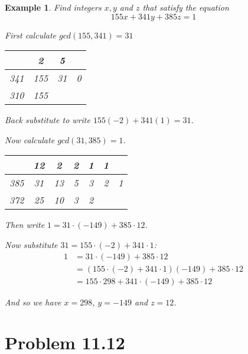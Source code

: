 \documentclass[letterpaper, 12pt, oneside]{memoir}
\theoremstyle{mystyle}
\newtheorem{example}[thm]{Example}
\begin{document}
\begin{example}
    Find integers $x, y$ and $z$ that satisfy the equation
    \[155x + 341y + 385z = 1 \]
    
    First calculate $gcd(155, 341) = 31$
    \begin{table}[H]
    \centering
    \begin{tabular}{c|c|c|c}
            & 2   & 5  &   \\ \hline
        341 & 155 & 31 & 0 \\ \hline
        310 & 155 &    & 
    \end{tabular}
    \end{table}
    
    Back substitute to write $155(-2) + 341(1)= 31$.
    
    Now calculate $gcd(31, 385) = 1$.
     \begin{table}[H]
    \centering
    \begin{tabular}{c|c|c|c|c|c|c}
            & 12  & 2   & 2  & 1  & 1  &   \\ \hline
        385 & 31  & 13  & 5  & 3  & 2  & 1 \\ \hline
        372 & 25  & 10  & 3  & 2  &    & 
    \end{tabular}
    \end{table}
    
    Then write $1 =  31 \cdot (-149) + 385 \cdot 12 $.
    
    Now substitute $31 = 155 \cdot (-2) + 341 \cdot 1$:
    \begin{align*}
        1 &= 31 \cdot (-149) + 385 \cdot 12 \\
          &= (155 \cdot (-2) + 341 \cdot 1) (-149) + 385 \cdot 12 \\
          &= 155 \cdot 298 + 341 \cdot (-149) + 385 \cdot 12
    \end{align*} 
    
    And so we have $x = 298$, $y = -149$ and $z = 12$.
    
\end{example}

\section{} 


\section{Problem 11.12} 

\end{document}
